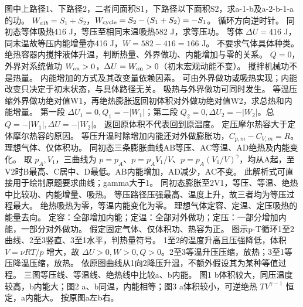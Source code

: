 \problemtext 图中上路径1、下路径2，二者间面积S1，下路径以下面积S2，求a-1-b及a-2-b-1-a的功。
\workings $W_{a1b}=S_1+S_2$，$W_{\rm cycle}=S_2-(S_1+S_2)=-S_1$。
\crosscheck 循环方向逆时针。
\problemtext 同初态等体吸热416 J，等压至相同末温吸热582 J，求等压功。
\workings 等体 $\Delta U=416$ J，同末温故等压内能增量亦416 J，$W=582-416=166$ J。
\crosscheck 不要求气体具体种类。
\problemtext 绝热容器内搅拌液体升温，判断热量、外界做功、内能增加与零的关系。
\workings $Q=0$，外界对系统做功 $W_{\rm on}>0$，$\Delta U=W_{\rm on}>0$（初末宏观动能不变）。
\crosscheck 搅拌机械功不是热量。
\problemtext 内能增加的方式及其改变量依赖因素。
\workings 可由外界做功或吸热实现；内能改变只决定于初末状态，与具体路径无关。
\crosscheck 吸热与外界做功可同时发生。
\problemtext 等温压缩外界做功绝对值W1，再绝热膨胀返回初体积对外做功绝对值W2，求总热和内能增量。
\workings 第一段 $\Delta U_1=0,Q_1=-|W_1|$；第二段 $Q_2=0,\Delta U_2=-|W_2|$。总 $Q=-|W_1|,\Delta U=-|W_2|$。
\crosscheck 返回原体积不代表回到原温度。
\problemtext 定压摩尔热容大于定体摩尔热容的原因。
\workings 等压升温时除增加内能还对外做膨胀功，$C_{p,m}-C_{V,m}=R$。
\crosscheck 理想气体、仅体积功。
\problemtext 同初态三条膨胀曲线AB等压、AC等温、AD绝热及内能变化。
\workings 取 $p_A,V_1$，三曲线为 $p=p_A$、$p=p_AV_1/V$、$p=p_A(V_1/V)^\gamma$，均从A起，至V2时B最高、C居中、D最低。AB内能增加，AD减少，AC不变。
\crosscheck 此解析式可直接用于绘制原题要求曲线；gamma大于1。
\problemtext 同初态膨胀至2V1，等压、等温、绝热中比较功、内能增量、吸热。
\workings 等压路径压强最高、温度上升，故三者均为等压过程最大。
\crosscheck 绝热吸热为零，等温内能变化为零。
\problemtext 理想气体定容、定温、定压吸热的能量去向。
\workings 定容：全部增加内能；定温：全部对外做功；定压：一部分增加内能，一部分对外做功。
\crosscheck 假定固定气体、仅体积功、热容为正。
\problemtext 图示p-T循环1至2曲线、2至3竖直、3至1水平，判热量符号。
\workings 1至2的温度升高且压强降低，体积 $V=\nu RT/p$ 增大，故 $\Delta U>0,W>0,Q>0$。2至3等温升压压缩，放热；3至1等压降温压缩，放热。
\crosscheck 依原图曲线从1向2降压升温，不额外假设其为某种等值过程。
\problemtext 三图等压线、等温线、绝热线中比较a、b内能。
\workings 图1 b体积较大，同压温度较高，b内能大；图2 a、b同温，内能相等；图3 a体积较小，可逆绝热 $TV^{\gamma-1}$ 恒定，a内能大。
\crosscheck 按原图a左b右。
